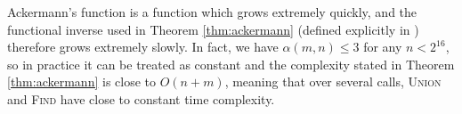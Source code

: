 Ackermann's function is a function which grows extremely quickly, and the
functional inverse used in Theorem \ref{thm:ackermann} (defined explicitly in
\cite{tarjan_1984}) therefore grows extremely slowly.  In fact, we have
$\alpha(m,n) \leq 3$ for any $n < 2^{16}$, so in practice it can be treated as
constant and the complexity stated in Theorem \ref{thm:ackermann} is close to
$O(n + m)$, meaning that over several calls, \textsc{Union} and \textsc{Find}
have close to constant time complexity.

